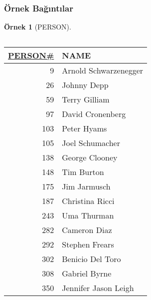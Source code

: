 \documentclass[dvipsnames]{beamer}
\theoremstyle{definition}
\theoremstyle{example}
\newtheorem{ornek}[theorem]{Örnek}
\theoremstyle{plain}
\begin{document}
\begin{frame}
  \frametitle{Örnek Bağıntılar}

  \begin{ornek}[PERSON]
    \begin{columns}[b]
      \begin{tiny}
      \begin{table}
        \begin{tabular}{|r|l|}\hline
\underline{PERSON\#} & NAME\\[2pt]\hline\hline
   9 & Arnold Schwarzenegger\\\hline
  26 & Johnny Depp          \\\hline
  59 & Terry Gilliam        \\\hline
  97 & David Cronenberg     \\\hline
 103 & Peter Hyams          \\\hline
 105 & Joel Schumacher      \\\hline
 138 & George Clooney       \\\hline
 148 & Tim Burton           \\\hline
 175 & Jim Jarmusch         \\\hline
 187 & Christina Ricci      \\\hline
 243 & Uma Thurman          \\\hline
 282 & Cameron Diaz         \\\hline
 292 & Stephen Frears       \\\hline
 302 & Benicio Del Toro     \\\hline
 308 & Gabriel Byrne        \\\hline
 350 & Jennifer Jason Leigh \\\hline
        \end{tabular}
      \end{table}
      \end{tiny}


\end{columns}
\end{ornek}
\end{frame}
\end{document}
